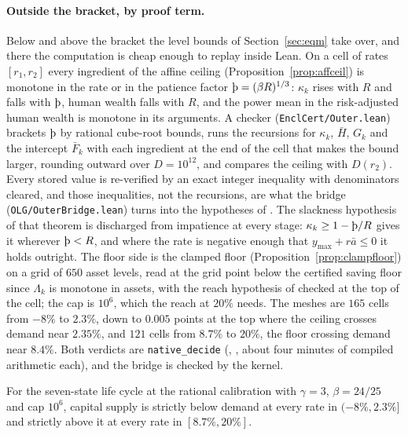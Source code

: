 \paragraph{Outside the bracket, by proof term.} Below and above the bracket the level bounds of
Section~\ref{sec:eqm} take over, and there the computation is cheap enough to replay inside Lean.
On a cell of rates $[r_1,r_2]$ every ingredient of the affine ceiling
(Proposition~\ref{prop:affceil}) is monotone in the rate or in the patience factor
$\Thorn=(\beta R)^{1/3}$: $\kappa_k$ rises with $R$ and falls with $\Thorn$, human wealth falls
with $R$, and the power mean in the risk-adjusted human wealth is monotone in its arguments. A
checker (\texttt{EnclCert/Outer.lean}) brackets $\Thorn$ by rational cube-root bounds, runs the
recursions for $\kappa_k$, $\bar H$, $G_k$ and the intercept $\bar F_k$ with each ingredient at the
end of the cell that makes the bound larger, rounding outward over $D=10^{12}$, and compares the
ceiling with $D(r_2)$. Every stored value is re-verified by an exact integer inequality with
denominators cleared, and those inequalities, not the recursions, are what the bridge
(\texttt{OLG/OuterBridge.lean}) turns into the hypotheses of .
The slackness hypothesis of that theorem is discharged from impatience at every stage:
$\kappa_k\ge1-\Thorn/R$ gives it wherever $\Thorn<R$, and where the rate is negative enough that
$y_{\max}+r\bar a\le0$ it holds outright. The floor side is the clamped floor
(Proposition~\ref{prop:clampfloor}) on a grid of $650$ asset levels, read at the grid point below
the certified saving floor since $\Lambda_k$ is monotone in assets, with the reach hypothesis of
 checked at the top of the cell; the cap is $10^6$, which the reach at
$20\%$ needs. The meshes are $165$ cells from $-8\%$ to $2.3\%$, down to $0.005$ points at the
top where the ceiling crosses demand near $2.35\%$, and $121$ cells from $8.7\%$ to $20\%$, the
floor crossing demand near $8.4\%$. Both verdicts are \texttt{native\_decide}
(, , about four minutes of compiled arithmetic
each), and the bridge is checked by the kernel.

\begin{theorem}\label{thm:outer}
For the seven-state life cycle at the rational calibration with $\gamma=3$, $\beta=24/25$ and cap
$10^6$, capital supply is strictly below demand at every rate in $(-8\%,2.3\%]$ and strictly above
it at every rate in $[8.7\%,20\%]$.
\end{theorem}

